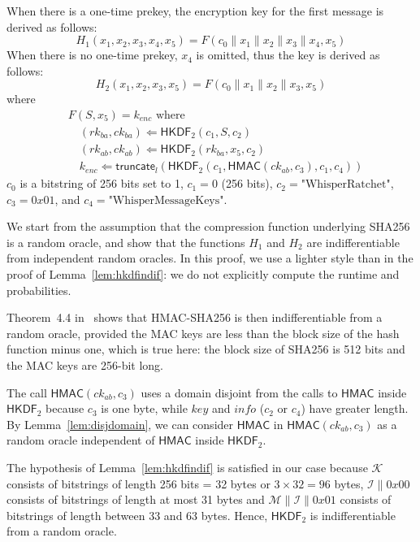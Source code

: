 \documentclass[compsoc, conference, letterpaper, 10pt, times]{IEEEtran}
\newcommand{\HMAC}{\mathsf{HMAC}}
\newcommand{\HKDF}{\mathsf{HKDF}}
\newcommand{\e}{\mathit{enc}}
\newcommand{\rk}{\mathit{rk}}
\newcommand{\ck}{\mathit{ck}}
\newcommand{\key}{\mathit{key}}
\newcommand{\info}{\mathit{info}}
\newcommand{\Skey}{\mathcal{K}}
\newcommand{\Sinfo}{\mathcal{I}}
\newcommand{\Smac}{\mathcal{M}}
\newcommand{\truncate}{\mathsf{truncate}}
\begin{document}
When there is a one-time prekey, the encryption key for 
the first message is derived as follows:
\[H_1(x_1, x_2, x_3, x_4, x_5) = F(c_0 \| x_1 \| x_2 \| x_3 \| x_4, x_5)\]
When there is no one-time prekey, $x_4$ is omitted, thus the key
is derived as follows:
\[H_2(x_1, x_2, x_3, x_5) = F(c_0 \| x_1 \| x_2 \| x_3, x_5)\]
where
\begin{align*}
&F(S, x_5) = k_{\e}\text{ where}\\
&\quad  (\rk_{ba}, \ck_{ba}) \Leftarrow \HKDF_2(c_1, S, c_2)\\
&\quad  (\rk_{ab}, \ck_{ab}) \Leftarrow \HKDF_2(\rk_{ba}, x_5, c_2)\\
&\quad  k_{\e} \Leftarrow \truncate_l(\HKDF_2(c_1, \HMAC(\ck_{ab}, c_3), c_1, c_4))
\end{align*}
$c_0$ is a bitstring of 256 bits set to 1,
$c_1 = 0$ (256 bits), $c_2 = \text{"WhisperRatchet"}$,
$c_3 = 0x01$, and $c_4 = \text{"WhisperMessageKeys"}$.

We start from the assumption that the compression function underlying
SHA256 is a random oracle, and show that the functions $H_1$ and $H_2$
are indifferentiable from independent random oracles. In this proof,
we use a lighter style than in the proof of Lemma~\ref{lem:hkdfindif}:
we do not explicitly compute the runtime and probabilities.


Theorem~4.4 in~\cite{Dodis12} shows that HMAC-SHA256 is then indifferentiable from a random oracle, provided the MAC keys are less than the block size of the hash function minus one, which is true here: the block size of SHA256 is 512 bits and the MAC keys are 256-bit long.

The call $\HMAC(\ck_{ab}, c_3)$ uses a domain disjoint from the 
calls to $\HMAC$ inside $\HKDF_2$ because $c_3$ is one byte, while
$\key$ and $\info$ ($c_2$ or $c_4$) have greater length.
By Lemma~\ref{lem:disjdomain}, we can consider $\HMAC$ in $\HMAC(\ck_{ab}, c_3)$
as a random oracle independent of $\HMAC$ inside $\HKDF_2$. 

The hypothesis of Lemma~\ref{lem:hkdfindif} is satisfied in our case
because $\Skey$ consists of bitstrings of length 256 bits = 32 bytes or $3 \times 32 = 96$ bytes,
$\Sinfo \| 0x00$ consists of bitstrings of length at most 31 bytes
and $\Smac \| \Sinfo \| 0x01$ consists of bitstrings of length between 33 and 63 bytes. Hence, $\HKDF_2$ is indifferentiable from a random oracle.
\end{document}
